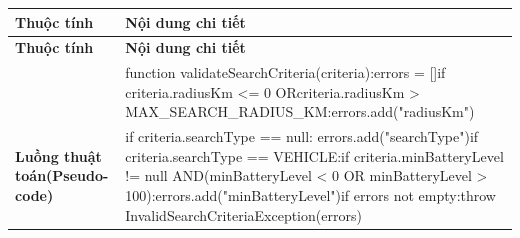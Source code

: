 \begin{longtable}{|L{0.24\textwidth}|L{0.70\textwidth}|}
\hline
\textbf{Thuộc tính} & \textbf{Nội dung chi tiết} \\
\hline
\endfirsthead
\hline
\textbf{Thuộc tính} & \textbf{Nội dung chi tiết} \\
\hline
\endhead
 & function validateSearchCriteria(criteria):\newline errors = []\newline if criteria.radiusKm <= 0 OR\newline criteria.radiusKm > MAX\_SEARCH\_RADIUS\_KM:\newline errors.add("radiusKm") \\
\hline
\textbf{Luồng thuật toán}\newline \textbf{(Pseudo-code)} & if criteria.searchType == null: errors.add("searchType")\newline if criteria.searchType == VEHICLE:\newline if criteria.minBatteryLevel != null AND\newline (minBatteryLevel < 0 OR minBatteryLevel > 100):\newline errors.add("minBatteryLevel")\newline if errors not empty:\newline throw InvalidSearchCriteriaException(errors) \\
\hline
\end{longtable}
\vspace{-0.5\baselineskip}
